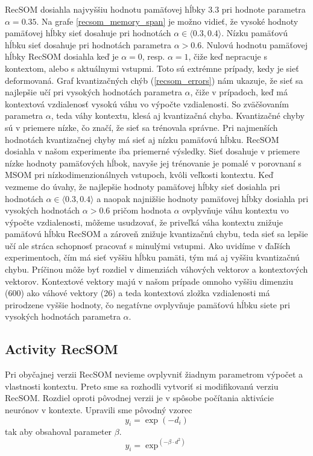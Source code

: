 RecSOM dosiahla najvyššiu hodnotu pamäťovej hĺbky $3.3$ pri hodnote parametra $\alpha = 0.35$.
Na grafe \ref{recsom_memory_span} je možno vidieť, že vysoké hodnoty pamäťovej hĺbky sieť dosahuje pri hodnotách $\alpha \in \langle 0.3, 0.4 \rangle$. 
Nízku pamäťovú hĺbku sieť dosahuje pri hodnotách parametra $\alpha > 0.6$.
Nulovú  hodnotu pamäťovej hĺbky RecSOM dosiahla keď je $\alpha = 0$, resp. $\alpha = 1$, čiže keď nepracuje s kontextom, alebo s aktuálnymi vstupmi. Toto sú extrémne prípady, kedy je sieť deformovaná.
Graf kvantizačných chýb (\ref{recsom_errors}) nám ukazuje, že sieť sa najlepšie učí pri vysokých hodnotách parametra $\alpha$, čiže v prípadoch, keď má 
kontextová vzdialenosť vysokú váhu vo výpočte vzdialenosti. 
So zväčšovaním parametra $\alpha$, teda váhy kontextu, klesá aj kvantizačná chyba.
Kvantizačné chyby sú v priemere nízke, čo značí, že sieť sa trénovala správne.
Pri najmenších hodnotách kvantizačnej chyby má sieť aj nízku pamäťovú hĺbku.
RecSOM dosiahla v našom experimente iba priemerné výsledky. Sieť dosahuje v priemere nízke hodnoty pamäťových hĺbok, navyše jej trénovanie je pomalé v porovnaní s MSOM pri nízkodimenzionálnych vstupoch, kvôli veľkosti kontextu.
Keď vezmeme do úvahy, že najlepšie hodnoty pamäťovej hĺbky sieť dosiahla pri hodnotách $\alpha \in \langle 0.3, 0.4 \rangle$ a naopak najnižšie hodnoty pamäťovej hĺbky dosiahla pri vysokých hodnotách $\alpha > 0.6$
pričom hodnota $\alpha$ ovplyvňuje váhu kontextu vo výpočte vzdialenosti, môžeme usudzovať, že priveľká váha kontextu znižuje pamäťovú hĺbku RecSOM a zároveň znižuje kvantizačnú chybu, teda sieť sa lepšie učí ale stráca schopnosť pracovať s minulými vstupmi. 
Ako uvidíme v ďaľších experimentoch, čím má sieť vyššiu hĺbku pamäti, tým má aj vyššiu kvantizačnú chybu.
Príčinou môže byť rozdiel v dimenziách váhových vektorov a kontextových vektorov. Kontextové vektory majú v našom prípade omnoho vyššiu dimenziu (600) ako váhové vektory (26) a 
teda kontextová zložka vzdialenosti má prirodzene vyššie hodnoty, čo negatívne ovplyvňuje pamäťovú hĺbku siete pri vysokých hodnotách parametra $\alpha$.



\subsection{Activity RecSOM}
Pri obyčajnej verzii RecSOM nevieme ovplyvniť žiadnym parametrom výpočet a vlastnosti kontextu. 
Preto sme sa rozhodli vytvoriť si modifikovanú verziu RecSOM. Rozdiel oproti pôvodnej verzii je v spôsobe počítania 
aktivácie neurónov v kontexte. 
Upravili sme pôvodný vzorec %
\begin{equation}
    y_{i} = \exp{(-d_{i})}
\end{equation}
tak aby obsahoval parameter $\beta$.
\begin{equation}
    y_{i} = \exp^{(-\beta \cdot d^2)}
\end{equation}

